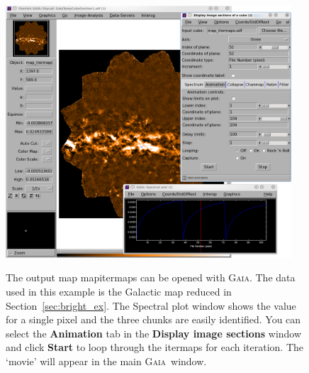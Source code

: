 \documentclass[twoside,11pt]{article}
\newcommand{\htmlref}[2]{#1}
\newenvironment{latexonly}{}{}
\newcommand{\latexhtml}[2]{#1}
\newcommand{\xref}[3]{#1}
\renewcommand{\_}{\texttt{\symbol{95}}}
\newenvironment{fmpage}[1]{\begin{lrbox}{\fmbox}\begin{minipage}{#1}}{\end{minipage}\end{lrbox}\fbox{\usebox{\fmbox}}}
\newcommand{\gaia}{\xref{\textsc{Gaia}}{sun214}{}}
\newcommand{\gaiathing}[1]{\textbf{#1}}
\newcommand{\cref}[3]{\latexhtml{#1~\ref{#2}}{\htmlref{#3}{#2}}}
\begin{document}
\begin{latexonly}
\begin{figure}[ht!]
\begin{center}
\begin{fmpage}{0.95\linewidth}
\begin{minipage}[c]{0.65\linewidth}
\centering
\includegraphics[width=0.95\textwidth]{sc21_itermaps_anim}

\end{minipage}
\hspace{0.3cm}
\begin{minipage}[c]{0.29\linewidth}
The output map map\_itermaps can be opened with \gaia. The data used
in this example is the Galactic map reduced in
\cref{Section}{sec:bright_ex}{dimmconfig\_bright\_extended.lis}. The
Spectral plot window shows the value for a single pixel and the three
chunks are easily identified. You can select the \gaiathing{Animation} tab
in the \gaiathing{Display image sections} window and click
\gaiathing{Start} to loop through the itermaps for each iteration.  The
`movie' will appear in the main \gaia\ window.
\end{minipage}

\vspace{0.7cm}


\end{fmpage}
\end{center}
\end{figure}
\end{latexonly}
\end{document}

